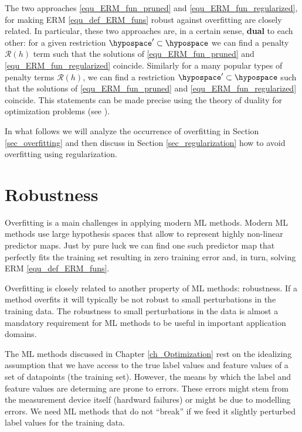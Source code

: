 \documentclass[12pt]{report}
\begin{document}
The two approaches \eqref{equ_ERM_fun_pruned} and \eqref{equ_ERM_fun_regularized}, for 
making ERM \eqref{equ_def_ERM_funs} robust against overfitting are closely related. In particular, 
these two approaches are, in a certain sense, {\bf dual} to each other: for a given restriction 
$\hypospace' \subset \hypospace$ we can find a penalty $\mathcal{R}(h)$ term such that the 
solutions of \eqref{equ_ERM_fun_pruned} and \eqref{equ_ERM_fun_regularized} coincide. Similarly 
for a many popular types of penalty terms $\mathcal{R}(h)$, we can find a restriction $\hypospace' \subset \hypospace$ 
such that the solutions of \eqref{equ_ERM_fun_pruned} and \eqref{equ_ERM_fun_regularized} coincide. 
This statements can be made precise using the theory of duality for optimization problems (see \cite{BertsekasNonLinProgr}). 



In what follows we will analyze the occurrence of overfitting 
in Section \ref{sec_overfitting} and then discuss in Section 
\ref{sec_regularization} how to avoid overfitting using regularization. 


\section{Robustness} 
\label{sec_robustness} 

Overfitting is a main challenges in applying modern ML methods. 
Modern ML methods use large hypothesis spaces that allow to 
represent highly non-linear predictor maps. Just by pure luck 
we can find one such predictor map that perfectly fits the 
training set resulting in zero training error and, in turn, solving 
ERM \eqref{equ_def_ERM_funs}. 

Overfitting is closely related to another property of ML methods: 
robustness. If a method overfits it will typically be not robust to 
small perturbations in the training data. The robustness to small 
perturbations in the data is almost a mandatory requirement for 
ML methods to be useful in important application domains. 

The ML methods discussed in Chapter \ref{ch_Optimization} rest on the 
idealizing assumption that we have access to the true label values and feature 
values of a set of datapoints (the training set). However, the means by which 
the label and feature values are determing are prone to errors. These errors might 
stem from the measurement device itself (hardward failures) or might be 
due to modelling errors. We need ML methods that do not ``break'' if we feed 
it slightly perturbed label values for the training data. 
\end{document}
